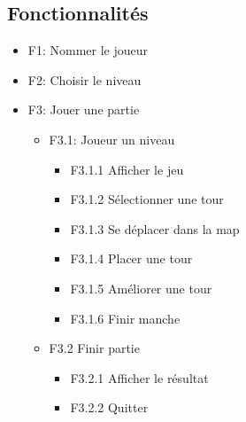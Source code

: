 \documentclass{article}
\begin{document}
        \subsection{Fonctionnalités}
        \begin{itemize}
        \item F1: Nommer le joueur
        \item F2: Choisir le niveau
        \item F3: Jouer une partie
    
        \begin{itemize}
          \item F3.1: Joueur un niveau
          \begin{itemize}
          \item F3.1.1 Afficher le jeu
          \item F3.1.2 Sélectionner une tour
          \item F3.1.3 Se déplacer dans la map
          \item F3.1.4 Placer une tour
          \item F3.1.5 Améliorer une tour
          \item F3.1.6 Finir manche
          \newline
        \end{itemize}
        
          \item F3.2 Finir partie
            \begin{itemize}
        \item F3.2.1 Afficher le résultat
        \item F3.2.2 Quitter
            \end{itemize}
            \end{itemize}
            \end{itemize}
\end{document}
